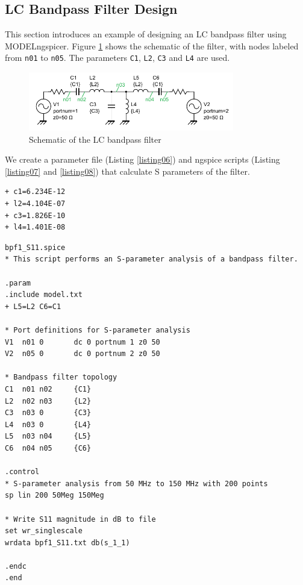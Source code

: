 \documentclass[a4paper,12pt,titlepage]{article}
\begin{document}
\subsection{LC Bandpass Filter Design}

This section introduces an example of designing an LC bandpass filter using MODELngspicer.
Figure \ref{fig:img02} shows the schematic of the filter, with nodes labeled from \texttt{n01} to
\texttt{n05}. The parameters \texttt{C1}, \texttt{L2}, \texttt{C3} and \texttt{L4} are used.

\begin{figure}[htbp]
    \centering
    \includegraphics[width=0.8\textwidth]{images/img02.pdf}
    \caption{Schematic of the LC bandpass filter}
    \label{fig:img02}
\end{figure}

We create a parameter file (Listing \ref{listing06}) and ngspice scripts (Listing \ref{listing07}
and \ref{listing08}) that calculate S parameters of the filter.

\begin{lstlisting}[label=listing06,caption=model\_initial.txt]
+ c1=6.234E-12
+ l2=4.104E-07
+ c3=1.826E-10
+ l4=1.401E-08
\end{lstlisting}

\begin{lstlisting}[label=listing07,caption=bpf1\_S11.spice]
bpf1_S11.spice
* This script performs an S-parameter analysis of a bandpass filter.

.param
.include model.txt
+ L5=L2 C6=C1

* Port definitions for S-parameter analysis
V1  n01 0       dc 0 portnum 1 z0 50
V2  n05 0       dc 0 portnum 2 z0 50

* Bandpass filter topology
C1  n01 n02     {C1}
L2  n02 n03     {L2}
C3  n03 0       {C3}
L4  n03 0       {L4}
L5  n03 n04     {L5}
C6  n04 n05     {C6}

.control
* S-parameter analysis from 50 MHz to 150 MHz with 200 points
sp lin 200 50Meg 150Meg

* Write S11 magnitude in dB to file
set wr_singlescale
wrdata bpf1_S11.txt db(s_1_1)

.endc
.end
\end{lstlisting}
\end{document}
